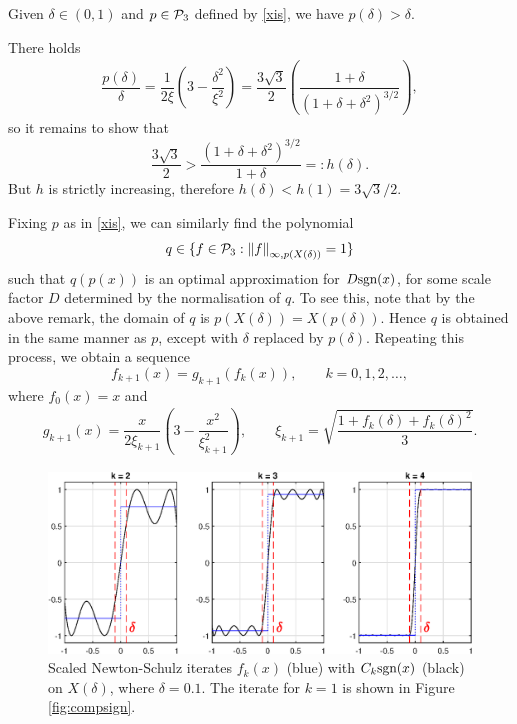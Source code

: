 \begin{lemma}\label{tekky}
Given $\delta \in (0,1)$ and $p \in \mathcal{P}_3$ defined by \eqref{xis}, we have $p(\delta)>\delta$.
\end{lemma}

\begin{sproof}
There holds
\begin{align*}
    \dfrac{p(\delta)}{\delta} =\dfrac{1}{2\xi}\left(3-\dfrac{\delta^2}{\xi^2}\right)= \dfrac{3\sqrt{3}}{2}\left(\dfrac{1+\delta}{(1+\delta+\delta^2)^{3/2}}\right),
\end{align*}
so it remains to show that
\[\dfrac{3\sqrt{3}}{2}>\dfrac{(1+\delta+\delta^2)^{3/2}}{1+\delta}=:h(\delta).\]
But $h$ is strictly increasing, therefore $h(\delta)<h(1)=3\sqrt{3}/2$.
\end{sproof}

Fixing $p$ as in \eqref{xis}, we can similarly find the polynomial 
\[q \in \{f \in \mathcal{P}_3 : \left\lVert f\right\rVert_{\infty,p(X(\delta))}=1\}\]
such that $q(p(x))$ is an optimal approximation for $D\text{sgn}(x)$, for some scale factor $D$ determined by the normalisation of $q$. To see this, note that by the above remark, the domain of $q$ is $p(X(\delta))=X(p(\delta))$. Hence $q$ is obtained in the same manner as $p$, except with $\delta$ replaced by $p(\delta)$. Repeating this process, we obtain a sequence
\[f_{k+1}(x)=g_{k+1}(f_{k}(x)), \qquad k=0,1,2,\dots,\]
where $f_0(x)=x$ and
\begin{align}
    g_{k+1}(x) =\dfrac{x}{2\xi_{k+1}}\left(3-\dfrac{x^2}{\xi_{k+1}^2}\right), \qquad \xi_{k+1}=\sqrt{\dfrac{1+f_{k}(\delta)+f_{k}(\delta)^2}{3}}. \label{compconsts}
\end{align}

\begin{figure}[t!]
\centering
   \includegraphics[width=\textwidth,height=\textheight,keepaspectratio]{figures/chapter_3/COMPSIGNthree.eps}
   \caption{Scaled Newton-Schulz iterates $f_k(x)$ (blue) with $C_k\text{sgn}(x)$ (black) on $X(\delta)$, where $\delta=0.1$. The iterate for $k=1$ is shown in Figure \ref{fig:compsign}.}
   \label{fig:compsign2}
\end{figure}

